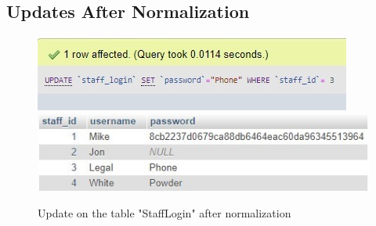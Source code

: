 \documentclass{article}
\begin{document}
	\subsection{Updates After Normalization}
		\begin{figure}[H]
			\includegraphics[width=\textwidth]{stafflogin1_update_norm}
			\includegraphics[width=\textwidth]{stafflogin2_update_norm}
			\caption{Update on the table "Staff\textunderscore Login" after normalization}
		\end{figure}
\end{document}
